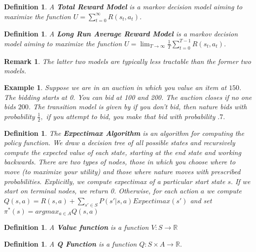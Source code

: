 \documentclass{amsart}
\newtheorem{defn}[subsubsection]{Definition}
\newtheorem{rem}[subsubsection]{Remark}
\newtheorem{eg}[subsection]{Example}
\begin{document}
\begin{defn}
A {\bf Total Reward Model} is a markov decision model aiming to maximize the function $U = \sum_{t = 0}^{\infty} R(s_t,a_t)$.
\end{defn}

\begin{defn}
A {\bf Long Run Average Reward Model} is a markov decision model aiming to maximize the function $U = \lim_{T \rightarrow \infty} \frac 1 T \sum_{t = 0}^{T-1} R(s_t,a_t)$.
\end{defn}

\begin{rem}
The latter two models are typically less tractable than the former two models.
\end{rem}

\begin{eg}
Suppose we are in an auction in which you value an item at $150.$ The bidding starts at 0. You can bid at 100 and 200. The auction closes if no one bids $200$. The transition model is given by if you don't bid, then nature bids with probability $\frac 1 2,$ if you attempt to bid, you make that bid with probability $.7.$
\end{eg}

\begin{defn}
The {\bf Expectimax Algorithm} is an algorithm for computing the policy function. We draw a decision tree of all possible states and recursively compute the expected value of each state, starting at the end state and working backwards. There are two types of nodes, those in which you choose where to move (to maximize your utility) and those where nature moves with prescribed probabilities. Explicitly, we compute expectimax of a particular start state $s.$ If we start on terminal nodes, we return 0. Otherwise, for each action $a$ we compute $Q(s,a) = R(s,a) + \sum_{s'\in S} P(s'|s,a) Expectimax(s')$ and set $\pi^*(s) = argmax_{a \in A} Q(s,a)$ 
\end{defn}

\begin{defn}
A {\bf Value function} is a function $V:S \rightarrow \mathbb R$ 
\end{defn}

\begin{defn}
A {\bf Q Function} is a function $Q:S \times A \rightarrow \mathbb R.$
\end{defn}
\end{document}
